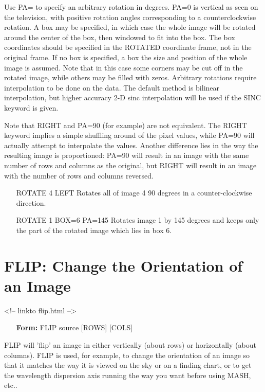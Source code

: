 Use PA= to specify an arbitrary rotation in degrees.  PA=0 is vertical as
seen on the television, with positive rotation angles corresponding to a
counterclockwise rotation. A box may be specified, in which case the whole
image will be rotated around the center of the box, then windowed to fit
into the box.  The box coordinates should be specified in the ROTATED
coordinate frame, not in the original frame. If no box is specified, a box
the size and position of the whole image is assumed.  Note that in this
case some corners may be cut off in the rotated image, while others may be
filled with zeros. Arbitrary rotations require interpolation to be done on
the data. The default method is bilinear interpolation, but higher accuracy
2-D sinc interpolation will be used if the SINC keyword is given.

Note that RIGHT and PA=90 (for example) are not equivalent.  The RIGHT
keyword implies a simple shuffling around of the pixel values, while PA=90
will actually attempt to interpolate the values.  Another difference lies
in the way the resulting image is proportioned: PA=90 will result in an
image with the same number of rows and columns as the original, but RIGHT
will result in an image with the number of rows and columns reversed.
\begin{itemize}
  \item[ROTATE 4 LEFT\hfill]{Rotates all of image 4 90 degrees
       in a counter-clockwise direction.}
  \item[ROTATE 1 BOX=6 PA=145\hfill]{Rotates image 1 by 145 degrees and
       keeps only the part of the rotated image which lies in box 6.}
\end{itemize}

\section{FLIP: Change the Orientation of an Image}
\begin{rawhtml}
<!-- linkto flip.html -->
\end{rawhtml}

\begin{itemize}
  \item[\textbf{Form: }FLIP source {[ROWS]} {[COLS]}\hfill]{}
\end{itemize}

FLIP will 'flip' an image in either vertically (about rows) or horizontally
(about columns).  FLIP is used, for example, to change the orientation of
an image so that it matches the way it is viewed on the sky or on a finding
chart, or to get the wavelength dispersion axis running the way you want
before using MASH, etc..

